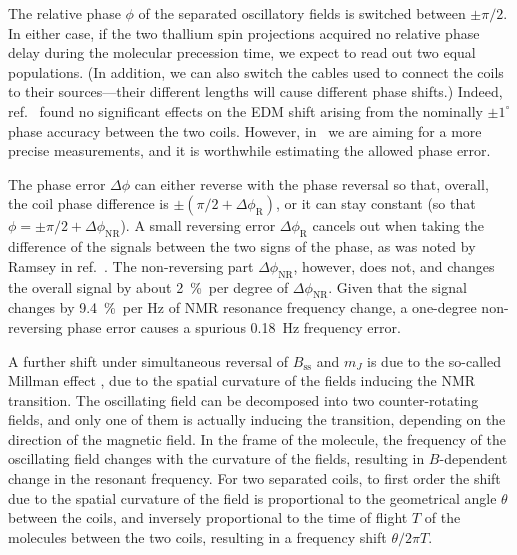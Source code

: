 The relative phase $\phi$ of the separated oscillatory fields is switched
between $\pm\pi/2$. In either case, if the two thallium spin projections
acquired no relative phase delay during the molecular precession time, we expect
to read out two equal populations. (In addition, we can also switch the cables
used to connect the coils to their sources---their different lengths will cause
different phase shifts.) Indeed, ref.~\cite{wilkening1984search} found no
significant effects on the \gls{EDM} shift arising from the nominally
$\pm1^\circ$ phase accuracy between the two coils. However, in \CENTREX\ we are
aiming for a more precise measurements, and it is worthwhile estimating the
allowed phase error.

The phase error $\Delta\phi$ can either reverse with the phase reversal so that,
overall, the coil phase difference is $\pm(\pi/2+\Delta\phi_\text{R})$, or it
can stay constant (so that $\phi=\pm\pi/2+\Delta\phi_\text{NR}$). A small
reversing error $\Delta\phi_\text{R}$ cancels out when taking the difference of
the signals between the two signs of the phase, as was noted by Ramsey in
ref.~\cite{ramsey1951phase}. The non-reversing part $\Delta\phi_\text{NR}$,
however, does not, and changes the overall signal by about 2~\%\ per degree of
$\Delta\phi_\text{NR}$. Given that the signal changes by 9.4~\%\ per Hz of
\gls{NMR}
resonance frequency change, a one-degree non-reversing phase error causes a
spurious 0.18~Hz frequency error.

A further shift under simultaneous reversal of $B_\text{ss}$ and $m_J$ is due to
the so-called Millman effect \cite{millman1939determination}, due to the spatial
curvature of the fields inducing the \gls{NMR} transition. The oscillating field can
be decomposed into two counter-rotating fields, and only one of them is actually
inducing the transition, depending on the direction of the magnetic field. In
the frame of the molecule, the frequency of the oscillating field changes with
the curvature of the fields, resulting in $B$-dependent change in the resonant
frequency. \cite{wilkening1984search} For two separated coils, to first order
the shift due to the spatial curvature of the field is proportional to the
geometrical angle $\theta$ between the coils, and inversely proportional to the
time of flight $T$ of the molecules between the two coils, resulting in a
frequency shift $\theta/2\pi T$. \cite[eqn~12]{cho1991search}

